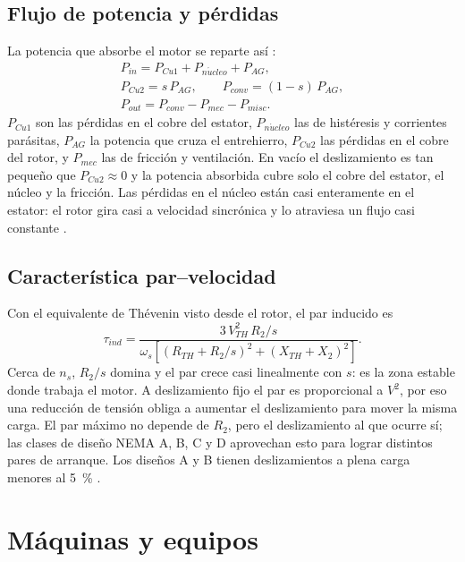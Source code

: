 \documentclass[conference]{IEEEtran}
\begin{document}
\subsection{Flujo de potencia y pérdidas}
La potencia que absorbe el motor se reparte así \cite{chapman}:
\begin{gather}
P_{in}=P_{Cu1}+P_{n\acute{u}cleo}+P_{AG},\label{eq:flujo1}\\
P_{Cu2}=s\,P_{AG},\qquad P_{conv}=(1-s)\,P_{AG},\label{eq:flujo2}\\
P_{out}=P_{conv}-P_{mec}-P_{misc}.\label{eq:flujo3}
\end{gather}
$P_{Cu1}$ son las pérdidas en el cobre del estator, $P_{n\acute{u}cleo}$ las de histéresis y corrientes parásitas, $P_{AG}$ la potencia que cruza el entrehierro, $P_{Cu2}$ las pérdidas en el cobre del rotor, y $P_{mec}$ las de fricción y ventilación. En vacío el deslizamiento es tan pequeño que $P_{Cu2}\approx0$ y la potencia absorbida cubre solo el cobre del estator, el núcleo y la fricción. Las pérdidas en el núcleo están casi enteramente en el estator: el rotor gira casi a velocidad sincrónica y lo atraviesa un flujo casi constante \cite{guia}.

\subsection{Característica par--velocidad}
Con el equivalente de Thévenin visto desde el rotor, el par inducido es \cite{diapositivas}
\begin{equation}
\tau_{ind}=\frac{3\,V_{TH}^2\,R_2/s}{\omega_s\left[(R_{TH}+R_2/s)^2+(X_{TH}+X_2)^2\right]} .
\label{eq:par}
\end{equation}
Cerca de $n_s$, $R_2/s$ domina y el par crece casi linealmente con $s$: es la zona estable donde trabaja el motor. A deslizamiento fijo el par es proporcional a $V^2$, por eso una reducción de tensión obliga a aumentar el deslizamiento para mover la misma carga. El par máximo no depende de $R_2$, pero el deslizamiento al que ocurre sí; las clases de diseño NEMA A, B, C y D aprovechan esto para lograr distintos pares de arranque. Los diseños A y B tienen deslizamientos a plena carga menores al \SI{5}{\percent} \cite{diapositivas}.

\section{Máquinas y equipos}
\end{document}
